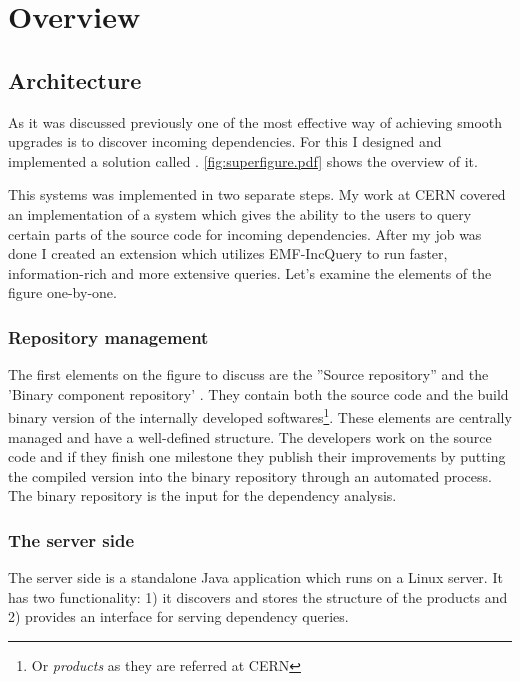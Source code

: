\chapter{Overview}


\section{Architecture}
As it was discussed previously one of the most effective  way of achieving
smooth upgrades is to discover incoming dependencies. For this I designed and
implemented a solution called \ptool{}.  \autoref{fig:superfigure.pdf} shows the overview of
it.

This systems was implemented in two separate steps. My work at CERN covered an
implementation of a system which gives the ability to the users to query certain
parts of the source code for incoming dependencies. After my job was done I
created an extension which utilizes EMF-IncQuery to run faster, information-rich
and more extensive queries. Let's examine the elements of the figure one-by-one.


\subsection{Repository management}
The first elements on the figure to discuss are the ''Source repository'' and
the 'Binary component repository' . They contain both the source code and the
build binary version of the internally developed softwares\footnote{Or
\textit{products} as they are referred at CERN}. These elements are centrally
managed and have a well-defined structure. The developers work on the source 
code and if they finish one milestone they publish their improvements by putting
the compiled version into the binary repository through an automated process.
The binary repository is the input for the dependency analysis.

\subsection{The server side}
The server side is a standalone Java application which runs on a Linux server.
It has two functionality: 1) it discovers and stores the structure of the
products and 2) provides an interface for serving dependency queries. 

